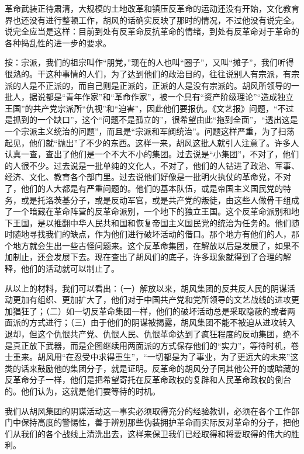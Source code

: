 革命武装正待肃清，大规模的土地改革和镇压反革命的运动还没有开始，文化教育界也还没有进行整顿工作，胡风的话确实反映了那时的情况，不过他没有说完全。说完全应当是这样：目前到处有反革命反抗革命的情绪，到处有反革命对于革命的各种捣乱性的进一步的要求。

按：宗派，我们的祖宗叫作“朋党，”现在的人也叫“圈子”，又叫“摊子”，我们听得很熟的。干这种事情的人们，为了达到他们的政治目的，往往说别人有宗派，有宗派的人是不正派的，而自己则是正派的，正派的人是没有宗派的。胡风所领导的一批人，据说都是“青年作家”和“革命作家”，被一个具有“资产阶级理论”“造成独立王国”的共产党宗派所“仇视”和“迫害”，因此他们要报仇。《文艺报》问题，“不过是抓到的一个缺口”，这个“问题不是孤立的”，很希望由此“拖到全面”，“透出这是一个宗派主义统治的问题”，而且是“宗派和军阀统治”。问题这样严重，为了扫荡起见，他们就“抛出”了不少的东西。这样一来，胡风这批人就引人注意了。许多人认真一查，查出了他们是一个不大不小的集团。过去说是“小集团”，不对了，他们的人很不少。过去说是一批单纯的文化人，不对了，他们的人钻进了政治、军事、经济、文化、教育各个部门里。过去说他们好像是一批明火执仗的革命党，不对了，他们的人大都是有严重问题的。他们的基本队伍，或是帝国主义国民党的特务，或是托洛茨基分子，或是反动军官，或是共产党的叛徒，由这些人做骨干组成了一个暗藏在革命阵营的反革命派别，一个地下的独立王国。这个反革命派别和地下王国，是以推翻中华人民共和国和恢复帝国主义国民党的统治为任务的。他们随时随地寻找我们的缺点，作为他们进行破坏活动的借口。那个地方有他们的人，那个地方就会生出一些古怪问题来。这个反革命集团，在解放以后是发展了，如果不加制止，还会发展下去。现在查出了胡风们的底子，许多现象就得到了合理的解释，他们的活动就可以制止了。

从以上的材料，我们可以看出：（一）解放以来，胡风集团的反共反人民的阴谋活动更加有组织、更加扩大了，他们对于中国共产党和党所领导的文艺战线的进攻更加猖狂了；（二）如一切反革命集团一样，他们的破坏活动总是采取隐蔽的或者两面派的方式进行；（三）由于他们的阴谋被揭露，胡风集团不能不被迫从进攻转入退却，但这个仇恨共产党、仇恨人民、仇恨革命达到了疯狂程度的反动集团，绝不是真正放下武器，而是企图继续用两面派的方式保存他们的“实力”，等待时机，卷士重来。胡风用“在忍受中求得重生”，“一切都是为了事业，为了更远大的未来”这类的话来鼓励他的集团分子，就是证明。反革命的胡风分子同其他公开的或暗藏的反革命分子一样，他们是把希望寄托在反革命政权的复辟和人民革命政权的倒台的。他们认为，这就是他们要等待的时机。

我们从胡风集团的阴谋活动这一事实必须取得充分的经验教训，必须在各个工作部门中保持高度的警惕性，善于辨别那些伪装拥护革命而实际反对革命的分子，把他们从我们的各个战线上清洗出去，这样来保卫我们已经取得和将要取得的伟大的胜利。


